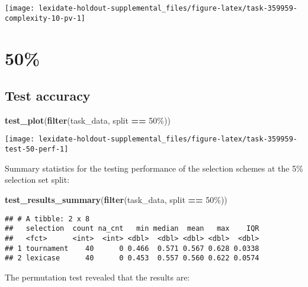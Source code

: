 \documentclass[
]{book}
\newenvironment{Shaded}{\begin{snugshade}}{\end{snugshade}}
\newcommand{\FunctionTok}[1]{\textcolor[rgb]{0.13,0.29,0.53}{\textbf{#1}}}
\newcommand{\NormalTok}[1]{#1}
\newcommand{\SpecialCharTok}[1]{\textcolor[rgb]{0.81,0.36,0.00}{\textbf{#1}}}
\newcommand{\StringTok}[1]{\textcolor[rgb]{0.31,0.60,0.02}{#1}}
\begin{document}
\texttt{[image: lexidate-holdout-supplemental\_files/figure-latex/task-359959-complexity-10-pv-1]}

\hypertarget{section-37}{%
\section{50\%}\label{section-37}}

\hypertarget{test-accuracy-37}{%
\subsection{Test accuracy}\label{test-accuracy-37}}

\begin{Shaded}
\begin{Highlighting}[]
\FunctionTok{test\_plot}\NormalTok{(}\FunctionTok{filter}\NormalTok{(task\_data, split }\SpecialCharTok{==} \StringTok{\textquotesingle{}50\%\textquotesingle{}}\NormalTok{))}
\end{Highlighting}
\end{Shaded}

\texttt{[image: lexidate-holdout-supplemental\_files/figure-latex/task-359959-test-50-perf-1]}

Summary statistics for the testing performance of the selection schemes at the 5\% selection set split:

\begin{Shaded}
\begin{Highlighting}[]
\FunctionTok{test\_results\_summary}\NormalTok{(}\FunctionTok{filter}\NormalTok{(task\_data, split }\SpecialCharTok{==} \StringTok{\textquotesingle{}50\%\textquotesingle{}}\NormalTok{))}
\end{Highlighting}
\end{Shaded}

\begin{verbatim}
## # A tibble: 2 x 8
##   selection  count na_cnt   min median  mean   max    IQR
##   <fct>      <int>  <int> <dbl>  <dbl> <dbl> <dbl>  <dbl>
## 1 tournament    40      0 0.466  0.571 0.567 0.628 0.0338
## 2 lexicase      40      0 0.453  0.557 0.560 0.622 0.0574
\end{verbatim}

The permutation test revealed that the results are:
\end{document}
